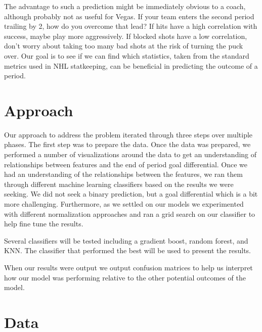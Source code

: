 \documentclass[twocolumn,letterpaper,12pt,notitlepage]{article}
\begin{document}
The advantage to such a prediction might be immediately obvious to a coach, although probably
not as useful for Vegas. If your team enters the second period trailing by 2, how do you overcome that
lead? If hits have a high correlation with success, maybe play more aggressively. If blocked shots have a
low correlation, don’t worry about taking too many bad shots at the risk of turning the puck over. Our
goal is to see if we can find which statistics, taken from the standard metrics used in NHL statkeeping,
can be beneficial in predicting the outcome of a period.

\section{Approach}

Our approach to address the problem iterated through three steps over multiple phases. The first step was to prepare the data. Once the data was prepared, we performed a number of visualizations around the data to get an understanding of relationships between features and the end of period goal differential. Once we had an understanding of the relationships between the features, we ran them through different machine learning classifiers based on the results we were seeking. We did not seek a binary prediction, but a goal differential which is a bit more challenging. Furthermore, as we settled on our models we experimented with different normalization approaches and ran a grid search on our classifier to help fine tune the results.

Several classifiers will be tested including a gradient boost, random forest, and KNN. The classifier that performed the best will be used to present the results.

When our results were output we output confusion matrices to help us interpret how our model was performing relative to the other potential outcomes of the model. 

\section{Data}
\end{document}
